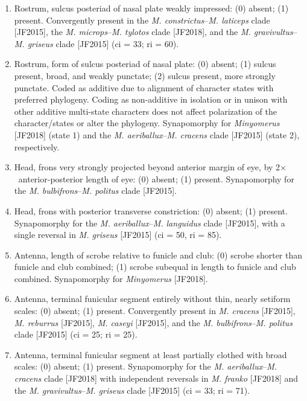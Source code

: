 \documentclass[fleqn,10pt,lineno]{wlpeerj} %
\newcommand{\x}{$\times$~}
\begin{document}
\begin{enumerate}
	 	\item Rostrum, sulcus posteriad of nasal plate weakly impressed: (0) absent; (1) present. Convergently present in the \textit{M. constrictus}--\textit{M. laticeps} clade [JF2015], the \textit{M. microps}--\textit{M. tylotos} clade [JF2018], and the \textit{M. gravivultus}--\textit{M. griseus} clade [JF2015] (ci = 33; ri = 60).
	 	
	 	\item Rostrum, form of sulcus posteriad of nasal plate: (0) absent; (1) sulcus present, broad, and weakly punctate; (2) sulcus present, more strongly punctate. Coded as additive due to alignment of character states with preferred phylogeny. Coding as non-additive in isolation or in unison with other additive multi-state characters does not affect polarization of the character/states or alter the phylogeny. Synapomorphy for \textit{Minyomerus} [JF2018] (state 1) and the \textit{M. aeriballux}--\textit{M. cracens} clade [JF2015] (state 2), respectively.
	 	
	 	\item Head, frons very strongly projected beyond anterior margin of eye, by 2\x anterior-posterior length of eye: (0) absent; (1) present. Synapomorphy for the \textit{M. bulbifrons}--\textit{M. politus} clade [JF2015].

	 	\item Head, frons with posterior transverse constriction: (0) absent; (1) present. Synapomorphy for the \textit{M. aeriballux}--\textit{M. languidus} clade [JF2015], with a single reversal in \textit{M. griseus} [JF2015] (ci = 50, ri = 85).
	 	
	 	\item Antenna, length of scrobe relative to funicle and club: (0) scrobe shorter than funicle and club combined; (1) scrobe subequal in length to funicle and club combined. Synapomorphy for \textit{Minyomerus} [JF2018].
	 	
	 	\item Antenna, terminal funicular segment entirely without thin, nearly setiform scales: (0) absent; (1) present. Convergently present in \textit{M. cracens} [JF2015], \textit{M. reburrus} [JF2015], \textit{M. caseyi} [JF2015], and the \textit{M. bulbifrons}--\textit{M. politus} clade [JF2015] (ci = 25; ri = 25).
	 	
	 	\item Antenna, terminal funicular segment at least partially clothed with broad scales: (0) absent; (1) present. Synapomorphy for the \textit{M. aeriballux}--\textit{M. cracens} clade [JF2018] with independent reversals in \textit{M. franko} [JF2018] and the \textit{M. gravivultus}--\textit{M. griseus} clade [JF2015] (ci = 33; ri = 71).
	 	

\end{enumerate}
\end{document}
